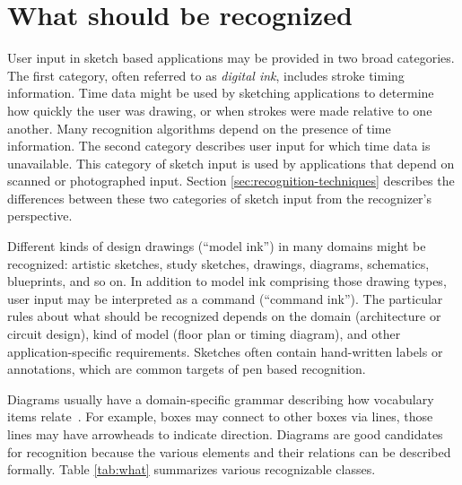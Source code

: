 \section{What should be recognized}
\label{sec:recognition-what}

User input in sketch based applications may be provided in two broad
categories. The first category, often referred to as \textit{digital
ink}, includes stroke timing information. Time data might be used by
sketching applications to determine how quickly the user was drawing,
or when strokes were made relative to one another. Many recognition
algorithms depend on the presence of time information. The second
category describes user input for which time data is unavailable. This
category of sketch input is used by applications that depend on
scanned or photographed
input. Section \ref{sec:recognition-techniques} describes the
differences between these two categories of sketch input from the
recognizer's perspective.

Different kinds of design drawings (``model ink'') in many domains
might be recognized: artistic sketches, study sketches, drawings,
diagrams, schematics, blueprints, and so on. In addition to model ink
comprising those drawing types, user input may be interpreted as a
command (``command ink''). The particular rules about what should be
recognized depends on the domain (architecture or circuit design),
kind of model (floor plan or timing diagram), and other
application-specific requirements. Sketches often contain hand-written
labels or annotations, which are common targets of pen based
recognition.

Diagrams usually have a domain-specific grammar describing how
vocabulary items relate~\cite{lakin-vmacs-89}. For example, boxes may
connect to other boxes via lines, those lines may have arrowheads to
indicate direction. Diagrams are good candidates for recognition
because the various elements and their relations can be described
formally. Table \ref{tab:what} summarizes various recognizable
classes.

